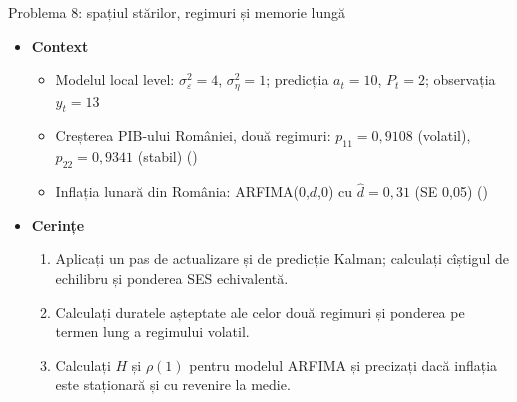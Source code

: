 \begin{frame}{Problema 8: spațiul stărilor, regimuri și memorie lungă}
\itemsize{\footnotesize}
\begin{itemize}
    \item \textbf{Context}
    \begin{itemize}
        \item Modelul local level: $\sigma^2_\varepsilon = 4$, $\sigma^2_\eta = 1$; predicția $a_t = 10$, $P_t = 2$; observația $y_t = 13$
        \item Creșterea PIB-ului României, două regimuri: $p_{11} = 0{,}9108$ (volatil), $p_{22} = 0{,}9341$ (stabil) ()
        \item Inflația lunară din România: ARFIMA(0,$d$,0) cu $\hat d = 0{,}31$ (SE 0{,}05) ()
    \end{itemize}
    \item \textbf{Cerințe}
\begin{enumerate}
    \item Aplicați un pas de actualizare și de predicție Kalman; calculați cîștigul de echilibru și ponderea SES echivalentă.
    \item Calculați duratele așteptate ale celor două regimuri și ponderea pe termen lung a regimului volatil.
    \item Calculați $H$ și $\rho(1)$ pentru modelul ARFIMA și precizați dacă inflația este staționară și cu revenire la medie.
\end{enumerate}
\end{itemize}
\end{frame}


